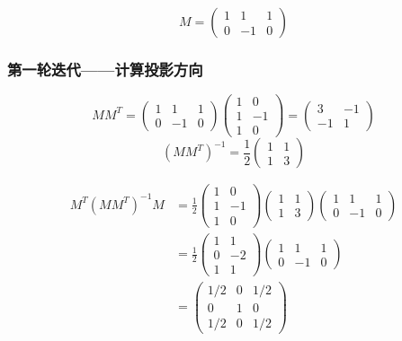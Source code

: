 {\[
M = \begin{pmatrix} 1 & 1 & 1 \\ 0 & -1 & 0 \end{pmatrix}
\]

\subsubsection{第一轮迭代——计算投影方向}

\[
MM^T = \begin{pmatrix}1&1&1\\0&-1&0\end{pmatrix}\begin{pmatrix}1&0\\1&-1\\1&0\end{pmatrix} = \begin{pmatrix}3&-1\\-1&1\end{pmatrix}
\]
\[
(MM^T)^{-1} = \frac{1}{2}\begin{pmatrix}1&1\\1&3\end{pmatrix}
\]

\begin{align*}
M^T(MM^T)^{-1}M
&= \frac{1}{2}\begin{pmatrix}1&0\\1&-1\\1&0\end{pmatrix}\begin{pmatrix}1&1\\1&3\end{pmatrix}
   \begin{pmatrix}1&1&1\\0&-1&0\end{pmatrix} \\
&= \frac{1}{2}\begin{pmatrix}1&1\\0&-2\\1&1\end{pmatrix}
   \begin{pmatrix}1&1&1\\0&-1&0\end{pmatrix} \\
&= \begin{pmatrix} 1/2 & 0 & 1/2 \\ 0 & 1 & 0 \\ 1/2 & 0 & 1/2 \end{pmatrix}
\end{align*}

}
